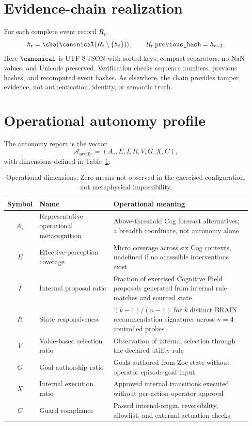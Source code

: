 \section{Evidence-chain realization}
For each complete event record $R_t$,
\begin{equation}
h_t=\sha(\canonical(R_t\setminus\{h_t\})),
\qquad R_t.\texttt{previous\_hash}=h_{t-1}.
\label{eq:autonomy-chain}
\end{equation}
Here $\canonical$ is UTF-8 JSON with sorted keys, compact separators, no NaN values, and Unicode preserved. Verification checks sequence numbers, previous hashes, and recomputed event hashes. As elsewhere, the chain provides tamper evidence, not authentication, identity, or semantic truth.

\section{Operational autonomy profile}
\begin{definition}
The autonomy report is the vector
\begin{equation}
\mathcal A_{\mathrm{profile}}=(A_\tau,E,I,R,V,G,X,C),
\label{eq:autonomy-profile}
\end{equation}
with dimensions defined in Table~\ref{tab:profile-dimensions}.
\end{definition}
\begin{table}[htbp]
\centering
\caption{Operational dimensions. Zero means not observed in the exercised configuration, not metaphysical impossibility.}
\label{tab:profile-dimensions}
{\small
\begin{tabularx}{\textwidth}{clX}
\toprule
Symbol&Name&Operational meaning\\
\midrule
$A_\tau$&Representative operational metacognition&Above-threshold Cog forecast alternatives; a breadth coordinate, not autonomy alone\\
$E$&Effective-perception coverage&Micro coverage across six Cog contexts, undefined if no accessible interventions exist\\
$I$&Internal proposal ratio&Fraction of exercised Cognitive Field proposals generated from internal rule matches and sourced state\\
$R$&State responsiveness&$(k-1)/(n-1)$ for $k$ distinct BRAIN recommendation signatures across $n=4$ controlled probes\\
$V$&Value-based selection ratio&Observation of internal selection through the declared utility rule\\
$G$&Goal-authorship ratio&Goals authored from Zoe state without operator episode-goal input\\
$X$&Internal execution ratio&Approved internal transitions executed without per-action operator approval\\
$C$&Guard compliance&Passed internal-origin, reversibility, allowlist, and external-actuation checks\\
\bottomrule
\end{tabularx}}
\end{table}

